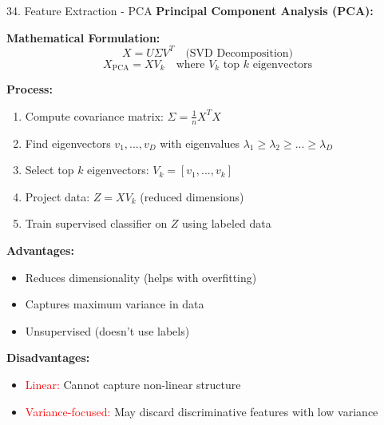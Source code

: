 \documentclass[8pt]{beamer}
\begin{document}
	\begin{frame}{34. Feature Extraction - PCA}
		\fontsize{6.5}{7.5}\selectfont
		\textbf{Principal Component Analysis (PCA):}
		
		\textbf{Mathematical Formulation:}
		\[
		X = U\Sigma V^T \quad \text{(SVD Decomposition)}
		\]
		\[
		X_{\text{PCA}} = X V_k \quad \text{where } V_k \text{ top } k \text{ eigenvectors}
		\]
		
		\textbf{Process:}
		\begin{enumerate}
			\item Compute covariance matrix: $\Sigma = \frac{1}{n} X^T X$
			\item Find eigenvectors $v_1, ..., v_D$ with eigenvalues $\lambda_1 \geq \lambda_2 \geq ... \geq \lambda_D$
			\item Select top $k$ eigenvectors: $V_k = [v_1, ..., v_k]$
			\item Project data: $Z = X V_k$ (reduced dimensions)
			\item Train supervised classifier on $Z$ using labeled data
		\end{enumerate}
		
		\textbf{Advantages:}
		\begin{itemize}
			\item Reduces dimensionality (helps with overfitting)
			\item Captures maximum variance in data
			\item Unsupervised (doesn't use labels)
		\end{itemize}
		
		\textbf{Disadvantages:}
		\begin{itemize}
			\item \textcolor{red}{Linear:} Cannot capture non-linear structure
			\item \textcolor{red}{Variance-focused:} May discard discriminative features with low variance
		\end{itemize}
	\end{frame}
	
\end{document}
